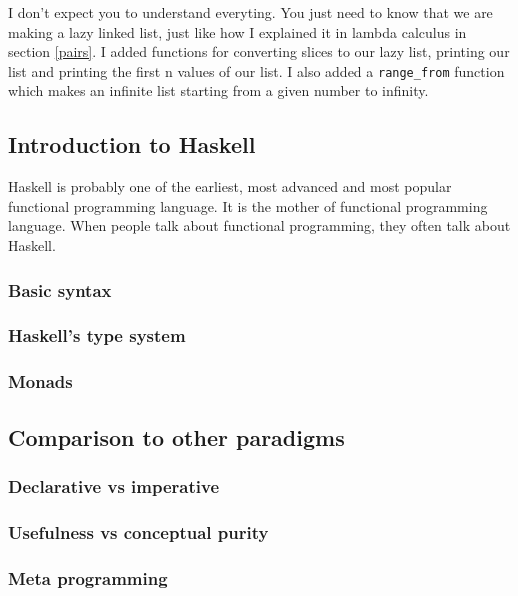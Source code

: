 \documentclass[11pt]{article}
\begin{document}
I don't expect you to understand everyting. You just need to know that we are
making a lazy linked list, just like how I explained it in lambda calculus in
section \ref{pairs}. I added functions for converting slices to our lazy list,
printing our list and printing the first n values of our list. I also added a
\texttt{range\_from} function which makes an infinite list starting from a
given number to infinity.


\subsection{Introduction to Haskell}

Haskell is probably one of the earliest, most advanced and most popular
functional programming language. It is the mother of functional programming
language. When people talk about functional programming, they often talk about
Haskell.

\subsubsection{Basic syntax}

\subsubsection{Haskell's type system}\label{types}

\subsubsection{Monads}

\subsection{Comparison to other paradigms}\label{comparison}

\subsubsection{Declarative vs imperative}

\subsubsection{Usefulness vs conceptual purity}\label{usefulness}

\subsubsection{Meta programming}\label{metaprogramming}
\end{document}
